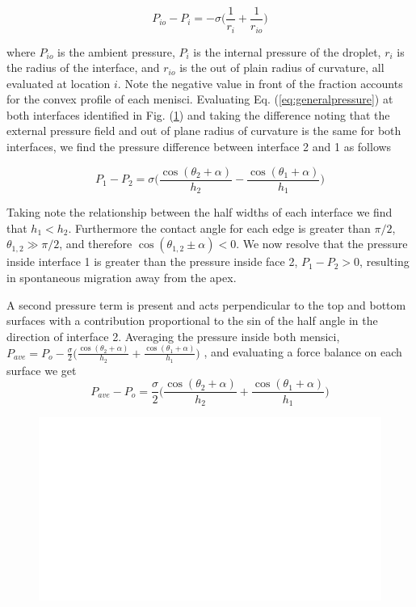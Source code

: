 \documentclass{article}
\begin{document}
\begin{equation}
	\label{eq:generalpressure}
P_{io} - P_i = -\sigma \Big( \frac{1}{r_i} + \frac{1}{r_{io}} \Big) 
\end{equation} 

\noindent where $P_{io}$ is the ambient pressure, $P_i$ is the internal pressure of the droplet, $r_i$ is the radius of the interface, and $r_{io}$ is the out of plain radius of curvature, all evaluated at location $i$. Note the negative value in front of the fraction accounts for the convex profile of each menisci. Evaluating Eq. (\ref{eq:generalpressure}) at both interfaces identified in Fig. (\ref{fig:schematic}) and taking the difference noting that the external pressure field and out of plane radius of curvature is the same for both interfaces, we find the pressure difference between interface 2 and 1 as follows 

\begin{equation}
\label{eq:pressurediff}
P_1 - P_2 = \sigma \Big(  \frac{\cos(\theta_2 + \alpha)}{h_2} -\frac{\cos(\theta_1 + \alpha)}{h_1} \Big)
\end{equation}
          
\noindent Taking note the relationship between the half widths of each interface we find that $h_1 < h_2$. Furthermore the contact angle for each edge is greater than $\pi/2$, $\theta_{1,2} \gg \pi/2$, and therefore $\cos(\theta_{1,2} \pm \alpha) < 0$. We now resolve that the pressure inside interface 1 is greater than the pressure inside face 2, $P_1 - P_2 > 0$, resulting in spontaneous migration away from the apex.

A second pressure term is present and acts perpendicular to the top and bottom surfaces with a contribution proportional to the sin of the half angle in the direction of interface 2. Averaging the pressure inside both mensici, $
P_{ave} = P_o -  \frac{\sigma}{2} \Big(  \frac{\cos(\theta_2 + \alpha)}{h_2} +\frac{\cos(\theta_1 + \alpha)}{h_1} \Big)$ , and evaluating a force balance on each surface we get 
$$
P_{ave} - P_o =  \frac{\sigma}{2} \Big(  \frac{\cos(\theta_2 + \alpha)}{h_2} +\frac{\cos(\theta_1 + \alpha)}{h_1} \Big)
$$

\begin{figure}
	\centering
	\includegraphics[scale=0.65]{Figures/Schematic2}
	\caption{}
	\label{fig:schematic}
\end{figure}
\end{document}
